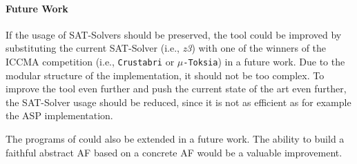 \paragraph{Future Work} If the usage of SAT-Solvers should be preserved, the tool could be improved by substituting the current SAT-Solver (i.e., \emph{z3}) with one of the winners of the ICCMA competition (i.e., \texttt{Crustabri} or \texttt{$\mu$-Toksia}) in a future work. Due to the modular structure of the implementation, it should not be too complex. To improve the tool even further and push the current state of the art even further, the SAT-Solver usage should be reduced, since it is not as efficient as for example the ASP implementation.

The programs of \prog could also be extended in a future work. The ability to build a faithful abstract AF based on a concrete AF would be a valuable improvement.
